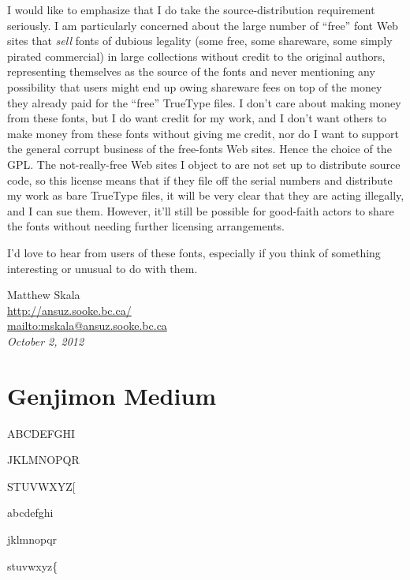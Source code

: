 \documentclass[12pt]{article}
\begin{document}
I would like to emphasize that I do take the source-distribution
requirement seriously.  I am particularly concerned about the large number
of ``free'' font Web sites that \emph{sell} fonts of dubious legality (some
free, some shareware, some simply pirated commercial) in large collections
without credit to the original authors, representing themselves as the
source of the fonts and never mentioning any possibility that users might
end up owing shareware fees on top of the money they already paid for the
``free'' TrueType files.  I don't care about making money from these fonts,
but I do want credit for my work, and I don't want others to make money from
these fonts without giving me credit, nor do I want to support the general
corrupt business of the free-fonts Web sites. Hence the choice of the GPL. 
The not-really-free Web sites I object to are not set up to distribute
source code, so this license means that if they file off the serial numbers
and distribute my work as bare TrueType files, it will be very clear that
they are acting illegally, and I can sue them.  However, it'll still be
possible for good-faith actors to share the fonts without needing further
licensing arrangements.

I'd love to hear from users of these fonts, especially if you think of
something interesting or unusual to do with them.

\vspace{\baselineskip}

\noindent Matthew Skala\\
\url{http://ansuz.sooke.bc.ca/}\\
\url{mailto:mskala@ansuz.sooke.bc.ca}\\
\textit{October 2, 2012}

\clearpage

\setlength{\parindent}{0pt}
\setlength{\parskip}{\baselineskip}


\section{Genjimon Medium}

{
ABCDEFGHI

JKLMNOPQR

STUVWXYZ[

abcdefghi

jklmnopqr

stuvwxyz\{}
\end{document}
